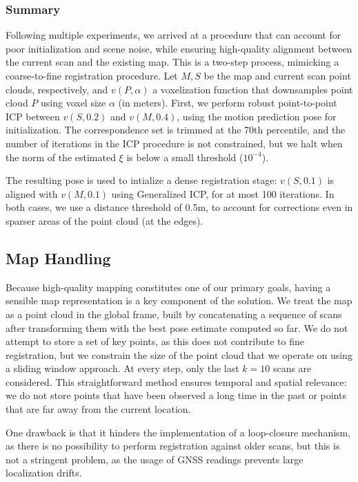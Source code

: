 \subsubsection{Summary}

Following multiple experiments, we arrived at a procedure that can account for poor initialization and scene noise, while ensuring high-quality alignment between the current scan and the existing map. This is a two-step process, mimicking a coarse-to-fine registration procedure. Let $M, S$ be the map and current scan point clouds, respectively, and $v(P, \alpha)$ a voxelization function that downsamples point cloud $P$ using voxel size $\alpha$ (in meters). First, we perform robust point-to-point ICP between $v(S, 0.2)$ and $v(M, 0.4)$, using the motion prediction pose for initialization. The correspondence set is trimmed at the 70th percentile, and the number of iterations in the ICP procedure is not constrained, but we halt when the norm of the estimated $\xi$ is below a small threshold ($10^{-4}$).

The resulting pose is used to intialize a dense registration stage: $v(S, 0.1)$ is aligned with $v(M, 0.1)$ using Generalized ICP, for at most 100 iterations. In both cases, we use a distance threshold of 0.5m, to account for corrections even in sparser areas of the point cloud (\eg at the edges).

\subsection{Map Handling}

Because high-quality mapping constitutes one of our primary goals, having a sensible map representation is a key component of the solution. We treat the map as a point cloud in the global frame, built by concatenating a sequence of scans after transforming them with the best pose estimate computed so far. We do not attempt to store a set of key points, as this does not contribute to fine registration, but we constrain the size of the point cloud that we operate on using a sliding window approach. At every step, only the last $k=10$ scans are considered. This straightforward method ensures temporal and spatial relevance: we do not store points that have been observed a long time in the past or points that are far away from the current location.

One drawback is that it hinders the implementation of a loop-closure mechanism, as there is no possibility to perform registration against older scans, but this is not a stringent problem, as the usage of GNSS readings prevents large localization drifts.

